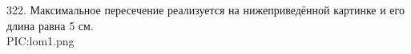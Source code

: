 322. Максимальное пересечение реализуется на нижеприведённой картинке и его длина равна 5 см.\\
{{PIC:lom1.png}}\\

